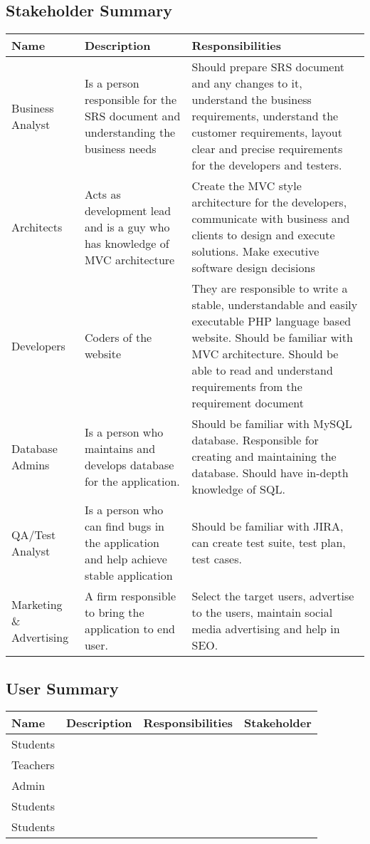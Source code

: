 \documentclass{article}
\begin{document}
\subsection{Stakeholder Summary}


\begin{tabular}{|p{4.5cm}|p{4.5cm}|p{6.5cm}|}
\hline
\textbf{Name} & \textbf{Description} & \textbf{Responsibilities} \\ \hline
Business Analyst & Is a person responsible for the SRS document and understanding the business needs & Should prepare SRS document and any changes to it, understand the business requirements, understand the customer requirements, layout clear and precise requirements for the developers and testers.\\ \hline
Architects & Acts as development lead and is a guy who has knowledge of MVC architecture  & Create the MVC style architecture for the developers, communicate with business and clients to design and execute solutions. Make executive software design decisions\\ \hline
Developers & Coders of the website & They are responsible to write a stable, understandable and easily executable PHP language based website. Should be familiar with MVC architecture. Should be able to read and understand requirements from the requirement document\\ \hline
Database Admins & Is a person who maintains and develops database for the application. & Should be familiar with MySQL database. Responsible for creating and maintaining the database. Should have in-depth knowledge of SQL.\\ \hline
QA/Test Analyst & Is a person who can find bugs in the application and help achieve stable application & Should be familiar with JIRA, can create test suite, test plan, test cases.\\ \hline
Marketing \& Advertising & A firm responsible to bring the application to end user. & Select the target users, advertise to the users, maintain social media advertising and help in SEO. \\ \hline
\end{tabular}


\subsection{User Summary}

\begin{tabular}{|p{3.5cm}|p{3.5cm}|p{4.5cm}|p{4cm}|}
\hline
\textbf{Name} & \textbf{Description} & \textbf{Responsibilities} & \textbf{Stakeholder}\\ \hline
Students &  & & \\ \hline
Teachers &  & & \\ \hline
Admin &  & & \\ \hline
Students &  & & \\ \hline
Students &  & & \\ \hline

\end{tabular}
\end{document}
